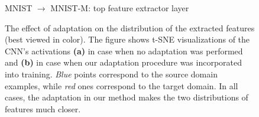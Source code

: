 \begin{figure}[t]
  \centering
  \small{{\sc MNIST $ \rightarrow $ MNIST-M}: top feature extractor layer}\\
  \setcounter{subfigure}{0}
  \hfill%

\medskip
  \caption{The effect of adaptation on the distribution of the extracted features (best viewed in color). The figure shows t-SNE \citep{maaten2008visualizing} visualizations of the CNN's activations {\bf (a)} in case when no adaptation was performed and {\bf (b)} in case when our adaptation procedure was incorporated into training. {\it Blue} points correspond to the source domain examples, while {\it red} ones correspond to the target domain. In all cases, the adaptation in our method makes the two distributions of features much closer.}
  \label{fig:exper_adapt_vis}
\end{figure}

